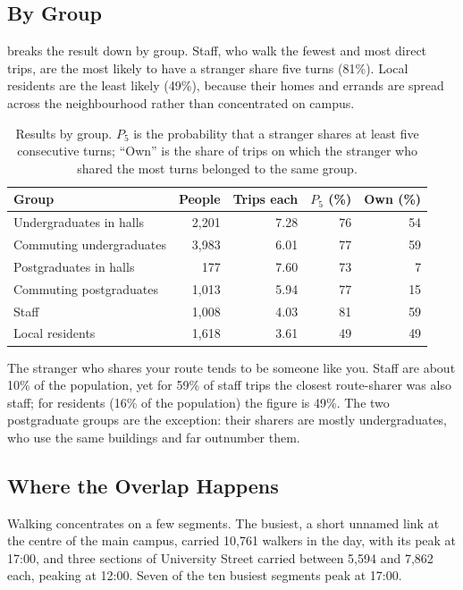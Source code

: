 \documentclass[9pt]{ieeeconf}
\begin{document}
\subsection{By Group}
 breaks the result down by group. Staff, who walk the fewest and most direct trips, are the most likely to have a stranger share five turns (81\%). Local residents are the least likely (49\%), because their homes and errands are spread across the neighbourhood rather than concentrated on campus.

\begin{table}[t]
\centering
\caption{Results by group. $P_5$ is the probability that a stranger shares at least five consecutive turns; ``Own'' is the share of trips on which the stranger who shared the most turns belonged to the same group.}
\label{tab:groups}
\begin{tabular}{lrrrr}
\toprule
Group & People & Trips each & $P_5$ (\%) & Own (\%) \\
\midrule
Undergraduates in halls   & 2,201 & 7.28 & 76 & 54 \\
Commuting undergraduates  & 3,983 & 6.01 & 77 & 59 \\
Postgraduates in halls    &   177 & 7.60 & 73 &  7 \\
Commuting postgraduates   & 1,013 & 5.94 & 77 & 15 \\
Staff                     & 1,008 & 4.03 & 81 & 59 \\
Local residents           & 1,618 & 3.61 & 49 & 49 \\
\bottomrule
\end{tabular}
\end{table}

The stranger who shares your route tends to be someone like you. Staff are about 10\% of the population, yet for 59\% of staff trips the closest route-sharer was also staff; for residents (16\% of the population) the figure is 49\%. The two postgraduate groups are the exception: their sharers are mostly undergraduates, who use the same buildings and far outnumber them.

\subsection{Where the Overlap Happens}
Walking concentrates on a few segments. The busiest, a short unnamed link at the centre of the main campus, carried 10,761 walkers in the day, with its peak at 17:00, and three sections of University Street carried between 5,594 and 7,862 each, peaking at 12:00. Seven of the ten busiest segments peak at 17:00.
\end{document}
